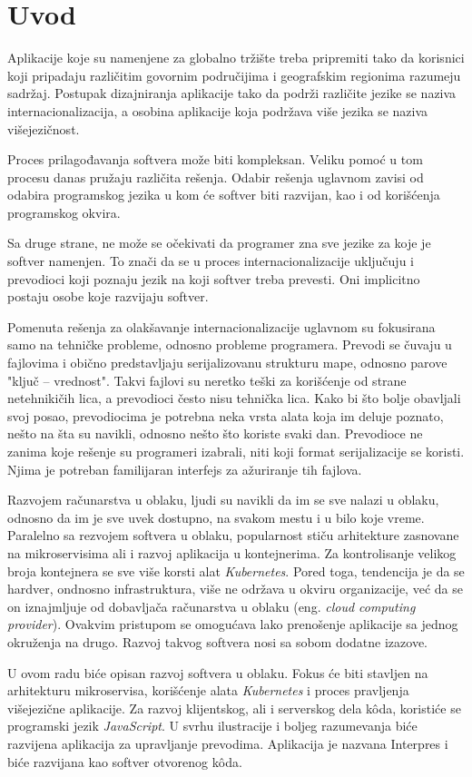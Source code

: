 \chapter{Uvod}\label{ch:uvod}

Aplikacije koje su namenjene za globalno tržište treba pripremiti 
tako da korisnici koji pripadaju različitim govornim područijima i 
geografskim regionima razumeju sadržaj. Postupak dizajniranja aplikacije 
tako da podrži različite jezike se naziva internacionalizacija, a osobina 
aplikacije koja podržava više jezika se naziva višejezičnost. 

Proces prilagođavanja softvera može biti kompleksan. Veliku pomoć u tom procesu
danas pružaju različita rešenja. Odabir rešenja uglavnom zavisi od odabira 
programskog jezika u kom će softver biti razvijan, kao i od korišćenja 
programskog okvira.

Sa druge strane, ne može se očekivati da programer zna sve jezike za koje je 
softver namenjen. To znači da se u proces internacionalizacije uključuju i 
prevodioci koji poznaju jezik na koji softver treba prevesti. Oni implicitno 
postaju osobe koje razvijaju softver.

Pomenuta rešenja za olakšavanje internacionalizacije uglavnom su fokusirana
samo na tehničke probleme, odnosno probleme programera. Prevodi se čuvaju u
fajlovima i obično predstavljaju serijalizovanu strukturu mape, odnosno parove
"ključ -- vrednost". Takvi fajlovi su neretko teški za korišćenje od strane
netehnikičih lica, a prevodioci često nisu tehnička lica. Kako bi što bolje 
obavljali svoj posao, prevodiocima je potrebna neka vrsta alata koja im deluje
poznato, nešto na šta su navikli, odnosno nešto što koriste svaki dan. 
Prevodioce ne zanima koje rešenje su programeri izabrali, niti koji format 
serijalizacije se koristi. Njima je potreban familijaran interfejs za ažuriranje
tih fajlova.

Razvojem računarstva u oblaku, ljudi su navikli da im se sve nalazi u oblaku, 
odnosno da im je sve uvek dostupno, na svakom mestu i u bilo koje vreme. 
Paralelno sa rezvojem softvera u oblaku, popularnost stiču arhitekture zasnovane
na mikroservisima ali i razvoj aplikacija u kontejnerima. Za kontrolisanje 
velikog broja kontejnera se sve više korsti alat \textit{Kubernetes}. Pored toga, 
tendencija je da se hardver, ondnosno infrastruktura, više ne održava u okviru
organizacije, već da se on iznajmljuje od dobavljača računarstva u oblaku 
(eng. \textit{cloud computing provider}). Ovakvim pristupom se omogućava lako 
prenošenje aplikacije sa jednog okruženja na drugo. Razvoj takvog softvera nosi
sa sobom dodatne izazove. 

U ovom radu biće opisan razvoj softvera u oblaku. Fokus će biti stavljen na 
arhitekturu mikroservisa, korišćenje alata \textit{Kubernetes} i proces pravljenja 
višejezične aplikacije. Za razvoj klijentskog, ali i serverskog dela 
kôda, koristiće se programski jezik \textit{JavaScript}. U svrhu ilustracije i
boljeg razumevanja biće razvijena aplikacija za upravljanje prevodima. 
Aplikacija je nazvana Interpres i biće razvijana kao softver otvorenog kôda.
